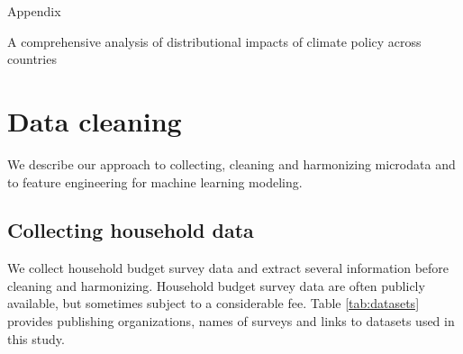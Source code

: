 \documentclass[12pt, a4paper]{article}
\begin{document}
\appendix 
\begin{refsection}
{\Huge Appendix} \label{sec:appendix}

A comprehensive analysis of distributional impacts of climate policy across countries

\clearpage
\section{Data cleaning} \label{sec:cleaning}

We describe our approach to collecting, cleaning and harmonizing microdata and to feature engineering for machine learning modeling.

\subsection{Collecting household data}

We collect household budget survey data and extract several information before cleaning and harmonizing. Household budget survey data are often publicly available, but sometimes subject to a considerable fee. Table \ref{tab:datasets} provides publishing organizations, names of surveys and links to datasets used in this study.


\end{refsection}
\end{document}
